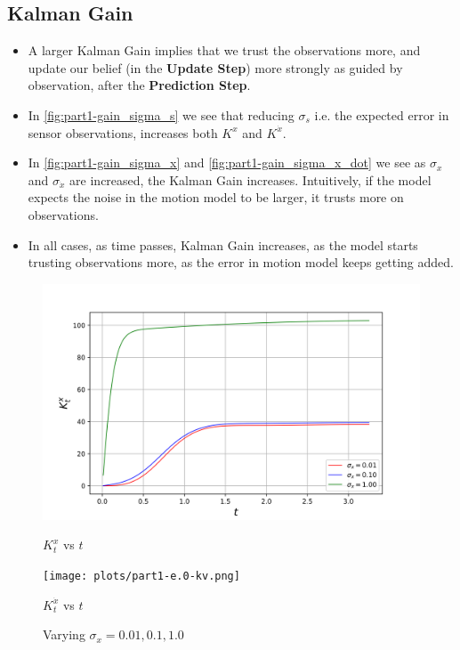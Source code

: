 \subsection{Kalman Gain}
\begin{itemize}
\item 
A larger Kalman Gain implies that we trust the observations more, and update our belief (in the \textbf{Update Step}) more strongly as guided by observation, after the \textbf{Prediction Step}.

\item In \autoref{fig:part1-gain_sigma_s} we see that reducing $\sigma_s$ i.e. the expected error in sensor observations, increases both $K^{x}$ and $K^{\dot{x}}$.

\item In \autoref{fig:part1-gain_sigma_x} and \autoref{fig:part1-gain_sigma_x_dot} we see as $\sigma_x$ and $\sigma_{\dot{x}}$ are increased, the Kalman Gain increases. Intuitively, if the model expects the noise in the motion model to be larger, it trusts more on observations.

\item In all cases, as time passes, Kalman Gain increases, as the model starts trusting observations more, as the error in motion model keeps getting added.
 
\end{itemize}
\begin{figure}[H]
    \centering
    \begin{minipage}{0.49\linewidth}
        \centering
        \includegraphics[width=\linewidth]{plots/part1-e.0-kx.png}
        \caption*{$K^x_t$ vs $t$}

    \end{minipage}
    \hfill
    \begin{minipage}{0.49\linewidth}
        \centering
        \texttt{[image: plots/part1-e.0-kv.png]}
         \caption*{$K^{\dot{x}}_t$ vs $t$}
    \end{minipage}
    \caption{Varying $\sigma_x = 0.01, 0.1, 1.0$}
    \label{fig:part1-gain_sigma_x}
\end{figure}

